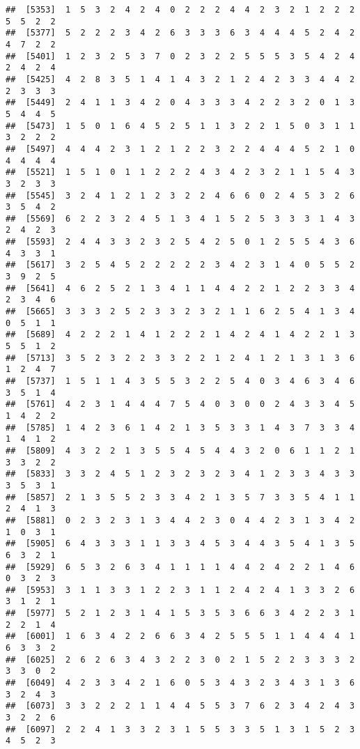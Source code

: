 \documentclass[
]{article}
\begin{document}
\begin{verbatim}
##  [5353]  1  5  3  2  4  2  4  0  2  2  2  4  4  2  3  2  1  2  2  2  5  5  2  2
##  [5377]  5  2  2  2  3  4  2  6  3  3  3  6  3  4  4  4  5  2  4  2  4  7  2  2
##  [5401]  1  2  3  2  5  3  7  0  2  3  2  2  5  5  5  3  5  4  2  4  2  4  2  4
##  [5425]  4  2  8  3  5  1  4  1  4  3  2  1  2  4  2  3  3  4  4  2  2  3  3  3
##  [5449]  2  4  1  1  3  4  2  0  4  3  3  3  4  2  2  3  2  0  1  3  5  4  4  5
##  [5473]  1  5  0  1  6  4  5  2  5  1  1  3  2  2  1  5  0  3  1  1  3  2  2  2
##  [5497]  4  4  4  2  3  1  2  1  2  2  3  2  2  4  4  4  5  2  1  0  4  4  4  4
##  [5521]  1  5  1  0  1  1  2  2  2  4  3  4  2  3  2  1  1  5  4  3  3  2  3  3
##  [5545]  3  2  4  1  2  1  2  3  2  2  4  6  6  0  2  4  5  3  2  6  3  5  4  2
##  [5569]  6  2  2  3  2  4  5  1  3  4  1  5  2  5  3  3  3  1  4  3  2  4  2  3
##  [5593]  2  4  4  3  3  2  3  2  5  4  2  5  0  1  2  5  5  4  3  6  4  3  3  1
##  [5617]  3  2  5  4  5  2  2  2  2  2  3  4  2  3  1  4  0  5  5  2  3  9  2  5
##  [5641]  4  6  2  5  2  1  3  4  1  1  4  4  2  2  1  2  2  3  3  4  2  3  4  6
##  [5665]  3  3  3  2  5  2  3  3  2  3  2  1  1  6  2  5  4  1  3  4  0  5  1  1
##  [5689]  4  2  2  2  1  4  1  2  2  2  1  4  2  4  1  4  2  2  1  3  5  5  1  2
##  [5713]  3  5  2  3  2  2  3  3  2  2  1  2  4  1  2  1  3  1  3  6  1  2  4  7
##  [5737]  1  5  1  1  4  3  5  5  3  2  2  5  4  0  3  4  6  3  4  6  3  5  1  4
##  [5761]  4  2  3  1  4  4  4  7  5  4  0  3  0  0  2  4  3  3  4  5  1  4  2  2
##  [5785]  1  4  2  3  6  1  4  2  1  3  5  3  3  1  4  3  7  3  3  4  1  4  1  2
##  [5809]  4  3  2  2  1  3  5  5  4  5  4  4  3  2  0  6  1  1  2  1  3  3  2  2
##  [5833]  3  3  2  4  5  1  2  3  2  3  2  3  4  1  2  3  3  4  3  3  3  5  3  1
##  [5857]  2  1  3  5  5  2  3  3  4  2  1  3  5  7  3  3  5  4  1  1  2  4  1  3
##  [5881]  0  2  3  2  3  1  3  4  4  2  3  0  4  4  2  3  1  3  4  2  1  0  3  1
##  [5905]  6  4  3  3  3  1  1  3  3  4  5  3  4  4  3  5  4  1  3  5  6  3  2  1
##  [5929]  6  5  3  2  6  3  4  1  1  1  1  4  4  2  4  2  2  1  4  6  0  3  2  3
##  [5953]  3  1  1  3  3  1  2  2  3  1  1  2  4  2  4  1  3  3  2  6  3  1  2  1
##  [5977]  5  2  1  2  3  1  4  1  5  3  5  3  6  6  3  4  2  2  3  1  2  2  1  4
##  [6001]  1  6  3  4  2  2  6  6  3  4  2  5  5  5  1  1  4  4  4  1  6  3  3  2
##  [6025]  2  6  2  6  3  4  3  2  2  3  0  2  1  5  2  2  3  3  3  2  3  3  0  2
##  [6049]  4  2  3  3  4  2  1  6  0  5  3  4  3  2  3  4  3  1  3  6  3  2  4  3
##  [6073]  3  3  2  2  2  1  1  4  4  5  5  3  7  6  2  3  4  2  4  3  3  2  2  6
##  [6097]  2  2  4  1  3  3  2  3  1  5  5  3  3  5  1  3  1  5  2  3  4  5  2  3

\end{verbatim}
\end{document}
